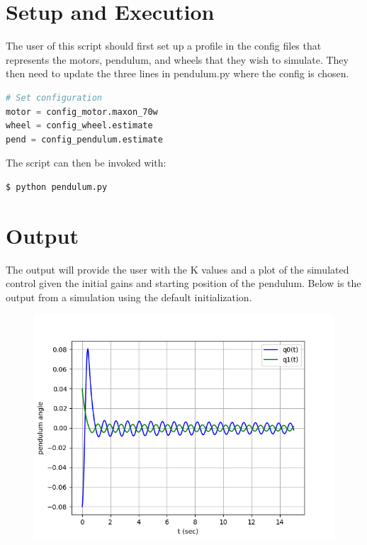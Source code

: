 \documentclass{article}
\begin{document}
\section*{\small Setup and Execution}
\noindent The user of this script should first set up a profile 
in the config files that represents the motors, pendulum, and 
wheels that they wish to simulate. They then need to update the 
three lines in pendulum.py where the config is chosen.

\begin{lstlisting}[language=python]
# Set configuration
motor = config_motor.maxon_70w
wheel = config_wheel.estimate
pend = config_pendulum.estimate
\end{lstlisting}

\noindent The script can then be invoked with:
\begin{lstlisting}[language=bash]
$ python pendulum.py
\end{lstlisting}

\section*{\small Output}
\noindent The output will provide the user with the K values and 
a plot of the simulated control given the initial gains and starting
position of the pendulum. Below is the output from a simulation using
the default initialization.

\begin{figure}
\centering
\includegraphics[width=1\linewidth]{time_series_default}
\end{figure}
\end{document}
